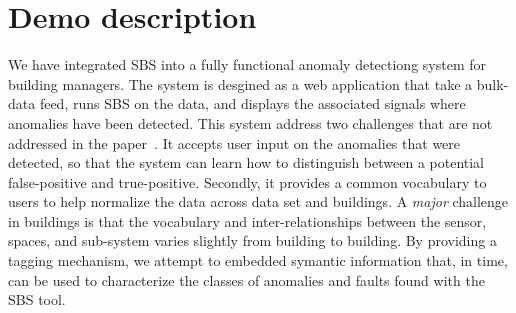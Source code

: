 
\section{Demo description}
We have integrated SBS into a fully functional anomaly detectiong system for building managers.  The system 
is desgined as a web application that take a bulk-data feed, runs SBS on the data, and displays the associated 
signals where anomalies have been detected.  This system address two challenges that are not addressed in the 
paper~\cite{SBS}.  It accepts user input on the anomalies that were detected, so that the system can learn
how to distinguish between a potential false-positive and true-positive.  Secondly, it provides a common vocabulary
to users to help normalize the data across data set and buildings.  A \emph{major} challenge in buildings 
is that the vocabulary and inter-relationships between the sensor, spaces, and sub-system varies slightly
from building to building.  By providing a tagging mechanism, we attempt to embedded symantic information
that, in time, can be used to characterize the classes of anomalies and faults found with the SBS tool.

